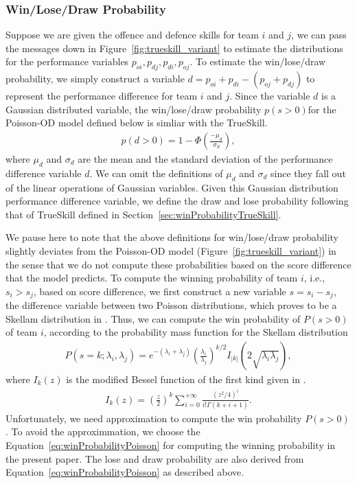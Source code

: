 \subsubsection{Win/Lose/Draw Probability}
\label{sec:winProbabilityPoisson}
Suppose we are given the offence and defence skills for team $i$ and $j$, we can pass the messages down in Figure~\ref{fig:trueskill_variant} to 
estimate the distributions for the performance variables $p_{oi}, p_{dj}, p_{di}, p_{oj}$. To estimate the win/lose/draw probability, we simply construct a  variable $d=p_{oi} + p_{di} - (p_{oj} + p_{dj})$ to represent the performance difference for team $i$ and $j$. Since the variable $d$ is a Gaussian distributed variable, the win/lose/draw probability $p(s>0)$for the Poisson-OD model defined below is simliar with the TrueSkill.
\begin{align}
  p(d>0) = 1 - \Phi\left(\frac{-\mu_d}{\sigma_d}\right),
\label{eq:winProbabilityPoisson}
\end{align}
where $\mu_d$ and $\sigma_d$ are the mean and the standard deviation of the performance difference variable $d$. We can omit the definitions of $\mu_d$ and $\sigma_d$ since they fall out of the linear operations of Gaussian variables. Given this Gaussian distribution performance difference variable, we define the draw and lose probability following that of TrueSkill defined in Section~\ref{sec:winProbabilityTrueSkill}. 

We pause here to note that the above definitions for win/lose/draw probability slightly deviates from the Poisson-OD model (Figure~\ref{fig:trueskill_variant}) in the sense that we do not compute these probabilities based on the score difference that the model predicts. To compute the winning probability of team $i$, i.e., $s_i>s_j$, based on score difference, we first construct a new variable $s= s_i-s_j$, the difference variable between two Poisson distributions, which proves to be a Skellam distribution in
\cite{Skellam46TheFrequencyDistribution}. Thus, we can compute the win
probability of $P(s>0)$ of team $i$, according to the probability mass
function for the Skellam distribution
\begin{align*}
     P(s=k; \lambda_i, \lambda_j) =e^{-(\lambda_i+\lambda_j)}\left(\frac{\lambda_i}{\lambda_j}\right)^{k/2}I_{|k|}\left(2\sqrt{\lambda_i\lambda_j}\right),
\end{align*}
where $I_{k}(z)$ is the modified Bessel function of the first kind given in \cite{Abramowitz74HandbookOfMathematical}.
\begin{align}
    I_k{(z)} = \left(\frac{z}{2}\right)^k\sum_{i=0}^{+\infty}\frac{(z^2/4)^i}{i!\Gamma(k+i+1)}.
\end{align}
Unfortunately, we need approximation to compute the win probability $P(s>0)$. To avoid the approximmation, we choose the Equation~\ref{eq:winProbabilityPoisson} for computing the winning probability in the present paper. The lose and draw probability are also derived from Equation~\ref{eq:winProbabilityPoisson} as described above. 

